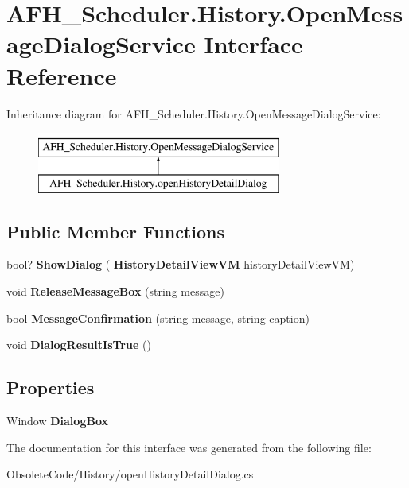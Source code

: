 \section{A\+F\+H\+\_\+\+Scheduler.\+History.\+Open\+Message\+Dialog\+Service Interface Reference}
\label{interface_a_f_h___scheduler_1_1_history_1_1_open_message_dialog_service}
Inheritance diagram for A\+F\+H\+\_\+\+Scheduler.\+History.\+Open\+Message\+Dialog\+Service\+:\begin{figure}[H]
\begin{center}
\leavevmode
\includegraphics[height=2.000000cm]{interface_a_f_h___scheduler_1_1_history_1_1_open_message_dialog_service}
\end{center}
\end{figure}
\subsection*{Public Member Functions}
\begin{DoxyCompactItemize}
\item 
\mbox{\label{interface_a_f_h___scheduler_1_1_history_1_1_open_message_dialog_service_a4db377180f4acfe9467eb34d626a8252}} 
bool? {\bfseries Show\+Dialog} (\textbf{ History\+Detail\+View\+VM} history\+Detail\+View\+VM)
\item 
\mbox{\label{interface_a_f_h___scheduler_1_1_history_1_1_open_message_dialog_service_aed46fb89cd72f05f586d1e1c32fd43a4}} 
void {\bfseries Release\+Message\+Box} (string message)
\item 
\mbox{\label{interface_a_f_h___scheduler_1_1_history_1_1_open_message_dialog_service_a474aa8dc8b20362f39748de7bd324c39}} 
bool {\bfseries Message\+Confirmation} (string message, string caption)
\item 
\mbox{\label{interface_a_f_h___scheduler_1_1_history_1_1_open_message_dialog_service_a291925008148dcea87e028fcee131f39}} 
void {\bfseries Dialog\+Result\+Is\+True} ()
\end{DoxyCompactItemize}
\subsection*{Properties}
\begin{DoxyCompactItemize}
\item 
\mbox{\label{interface_a_f_h___scheduler_1_1_history_1_1_open_message_dialog_service_af80443d3e618c3d1260c488661b08b66}} 
Window {\bfseries Dialog\+Box}\hspace{0.3cm}{\ttfamily  [get, set]}
\end{DoxyCompactItemize}


The documentation for this interface was generated from the following file\+:\begin{DoxyCompactItemize}
\item 
Obsolete\+Code/\+History/open\+History\+Detail\+Dialog.\+cs\end{DoxyCompactItemize}
